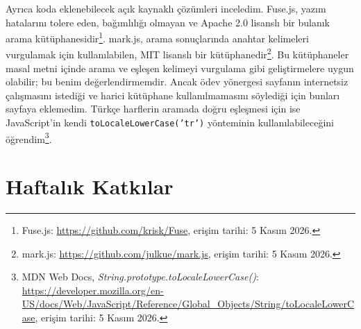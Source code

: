 \documentclass[12pt,a4paper]{article}
\begin{document}
Ayrıca koda eklenebilecek açık kaynaklı çözümleri inceledim. Fuse.js, yazım hatalarını
tolere eden, bağımlılığı olmayan ve Apache 2.0 lisanslı bir
bulanık arama kütüphanesidir\footnote{Fuse.js:
\url{https://github.com/krisk/Fuse}, erişim tarihi: 5 Kasım 2026.}.
mark.js, arama sonuçlarında anahtar kelimeleri vurgulamak için kullanılabilen, MIT
lisanslı bir kütüphanedir\footnote{mark.js:
\url{https://github.com/julkue/mark.js}, erişim tarihi: 5 Kasım 2026.}.
Bu kütüphaneler masal metni içinde arama ve eşleşen kelimeyi vurgulama gibi
geliştirmelere uygun olabilir; bu benim değerlendirmemdir. Ancak ödev yönergesi sayfanın
internetsiz çalışmasını istediği ve harici kütüphane kullanılmamasını söylediği için
bunları sayfaya eklemedim. Türkçe harflerin aramada doğru eşleşmesi için ise
JavaScript'in kendi \texttt{toLocaleLowerCase('tr')} yönteminin kullanılabileceğini
öğrendim\footnote{MDN Web Docs, \emph{String.prototype.toLocaleLowerCase()}:
\url{https://developer.mozilla.org/en-US/docs/Web/JavaScript/Reference/Global_Objects/String/toLocaleLowerCase},
erişim tarihi: 5 Kasım 2026.}.

\section{Haftalık Katkılar}
\end{document}
